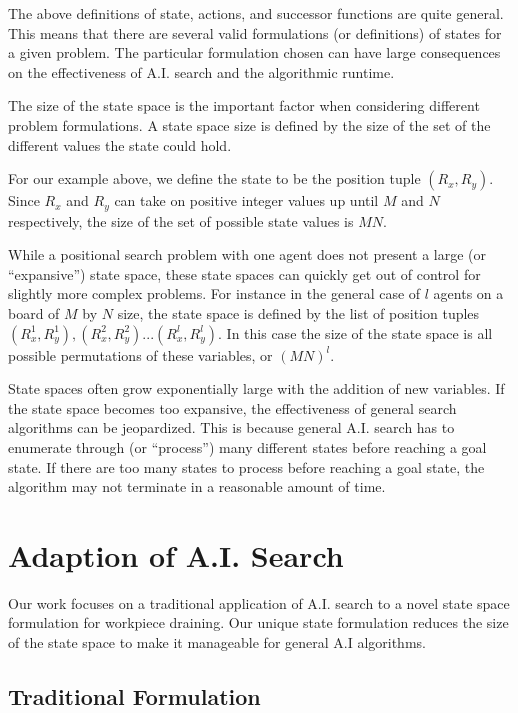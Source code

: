 The above definitions of state, actions, and successor functions are quite general. This means that there are several valid formulations (or definitions) of states for a given problem. The particular formulation chosen can have large consequences on the effectiveness of A.I. search and the algorithmic runtime.


The size of the state space is the important factor when considering different problem formulations. A state space size is defined by the size of the set of the different values the state could hold.

For our example above, we define the state to be the position tuple $(R_x, R_y)$. Since $R_x$ and $R_y$ can take on positive integer values up until $M$ and $N$ respectively, the size of the set of possible state values is $MN$.

While a positional search problem with one agent does not present a large (or ``expansive'') state space, these state spaces can quickly get out of control for slightly more complex problems. For instance in the general case of $l$ agents on a board of $M$ by $N$ size, the state space is defined by the list of position tuples $(R^1_x, R^1_y), (R^2_x, R^2_y)... (R^l_x, R^l_y)$. In this case the size of the state space is all possible permutations of these variables, or $(MN)^l$.

State spaces often grow exponentially large with the addition of new variables. If the state space becomes too expansive, the effectiveness of general search algorithms can be jeopardized. This is because general A.I. search has to enumerate through (or ``process'') many different states before reaching a goal state. If there are too many states to process before reaching a goal state, the algorithm may not terminate in a reasonable amount of time.

\section{Adaption of A.I. Search}

Our work focuses on a traditional application of A.I. search to a novel state space formulation for workpiece draining. Our unique state formulation reduces the size of the state space to make it manageable for general A.I algorithms.

	\subsection{Traditional Formulation}

